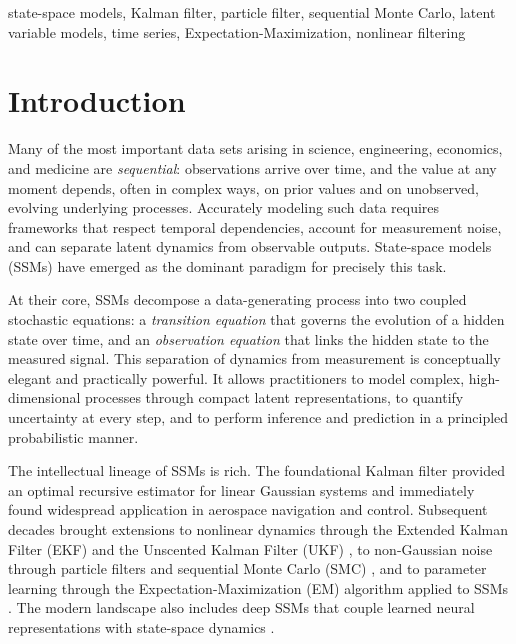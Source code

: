 \documentclass[conference]{IEEEtran}
\begin{document}
\begin{IEEEkeywords}
state-space models, Kalman filter, particle filter, sequential Monte Carlo, latent variable models, time series, Expectation-Maximization, nonlinear filtering
\end{IEEEkeywords}

\section{Introduction}

Many of the most important data sets arising in science, engineering, economics, and medicine are \emph{sequential}: observations arrive over time, and the value at any moment depends, often in complex ways, on prior values and on unobserved, evolving underlying processes. Accurately modeling such data requires frameworks that respect temporal dependencies, account for measurement noise, and can separate latent dynamics from observable outputs. State-space models (SSMs) have emerged as the dominant paradigm for precisely this task.

At their core, SSMs decompose a data-generating process into two coupled stochastic equations: a \emph{transition equation} that governs the evolution of a hidden state over time, and an \emph{observation equation} that links the hidden state to the measured signal. This separation of dynamics from measurement is conceptually elegant and practically powerful. It allows practitioners to model complex, high-dimensional processes through compact latent representations, to quantify uncertainty at every step, and to perform inference and prediction in a principled probabilistic manner.

The intellectual lineage of SSMs is rich. The foundational Kalman filter \cite{kalman1960new} provided an optimal recursive estimator for linear Gaussian systems and immediately found widespread application in aerospace navigation and control. Subsequent decades brought extensions to nonlinear dynamics through the Extended Kalman Filter (EKF) \cite{jazwinski1970stochastic} and the Unscented Kalman Filter (UKF) \cite{julier1997new}, to non-Gaussian noise through particle filters and sequential Monte Carlo (SMC) \cite{gordon1993novel,doucet2001sequential}, and to parameter learning through the Expectation-Maximization (EM) algorithm applied to SSMs \cite{shumway1982approach,dempster1977maximum}. The modern landscape also includes deep SSMs that couple learned neural representations with state-space dynamics \cite{rangapuram2018deep,gu2021efficiently}.
\end{document}
